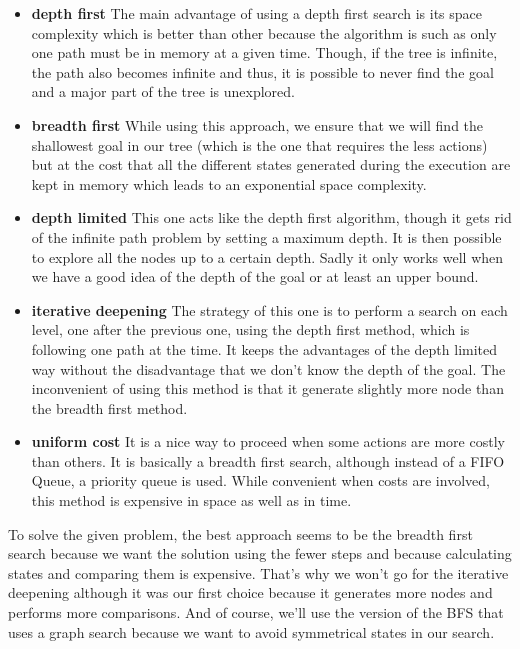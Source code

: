\documentclass[a4paper,10pt]{article}
\begin{document}
	\begin{itemize}
		\item \textbf{depth first} The main advantage of using a depth first search is its space complexity which is better than other because the algorithm is such as only one path must be in memory at a given time. 
		Though, if the tree is infinite, the path also becomes infinite and thus, it is possible to never find the goal and a major part of the tree is unexplored.
		\item \textbf{breadth first} While using this approach, we ensure that we will find the shallowest goal in our tree (which is the one that requires the less actions) but at the cost that all the different states generated during the execution are kept in memory which leads to an exponential space complexity.
		\item \textbf{depth limited} This one acts like the depth first algorithm, though it gets rid of the infinite path problem by setting a maximum depth. It is then possible to explore all the nodes up to a certain depth. 
		Sadly it only works well when we have a good idea of the depth of the goal or at least an upper bound.
		\item \textbf{iterative deepening} The strategy of this one is to perform a search on each level, one after the previous one, using the depth first method, which is following one path at the time. It keeps the advantages of the depth limited way without the disadvantage that we don't know the depth of the goal.
		The inconvenient of using this method is that it generate slightly more node than the breadth first method.
		\item \textbf{uniform cost} It is a nice way to proceed when some actions are more costly than others. It is basically a breadth first search, although instead of a FIFO Queue, a priority queue is used.
		While convenient when costs are involved, this method is expensive in space as well as in time.\\
	\end{itemize}
	To solve the given problem, the best approach seems to be the breadth first search because we want the solution using the fewer steps and because calculating states and comparing them is expensive. That's why we won't go for the iterative deepening although it was our first choice because it generates more nodes and performs more comparisons.
	And of course, we'll use the version of the BFS that uses a graph search because we want to avoid symmetrical states in our search.
	
\end{document}
